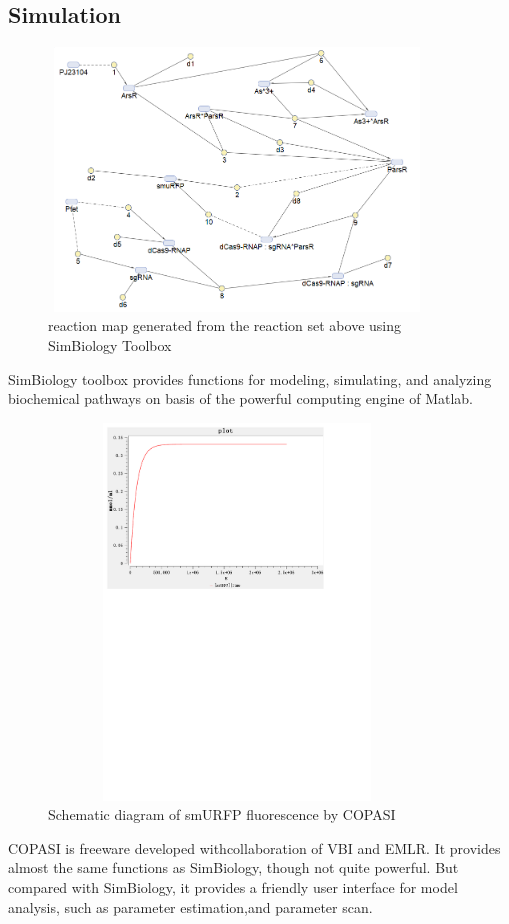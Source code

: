 \subsection{Simulation}
\begin{figure}[h]
	\centering
	\includegraphics[width=10cm,height=7cm]{screenshot003}	
	\caption{reaction map generated from the reaction set above using SimBiology Toolbox}
\end{figure}
SimBiology toolbox provides functions for modeling, simulating, and analyzing biochemical pathways on basis of the powerful computing engine of Matlab.

\begin{figure}[h]
	\centering
	\includegraphics[width=10cm,height=10cm]{smuRFP}
	\caption{Schematic diagram of smURFP fluorescence by COPASI}
\end{figure}

COPASI is freeware developed withcollaboration of VBI and EMLR. It provides
almost the same functions as SimBiology, though not quite powerful. But compared with SimBiology, it provides a friendly user interface for model analysis, such as parameter estimation,and parameter scan.

